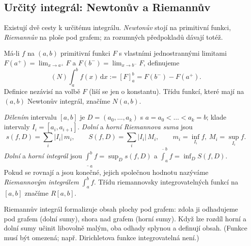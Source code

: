 \documentclass[11pt,a4paper]{article}
\begin{document}

\subsection{Určitý integrál: Newtonův a Riemannův}

Existují dvě cesty k určitému integrálu. \emph{Newtonův} stojí na primitivní funkci, \emph{Riemannův} na ploše pod grafem; za rozumných předpokladů dávají totéž.

\begin{definice}
Má-li $f$ na $(a,b)$ primitivní funkci $F$ s vlastními jednostrannými limitami $F(a^+)=\lim_{x\to a^+}F$ a $F(b^-)=\lim_{x\to b^-}F$, definujeme
\[
  (N)\!\int_a^b f(x)\,\mathrm{d}x:=[F]_a^b=F(b^-)-F(a^+).
\]
Definice nezávisí na volbě $F$ (liší se jen o konstantu). Třídu funkcí, které mají na $(a,b)$ Newtonův integrál, značíme $N(a,b)$.
\end{definice}

\begin{definice}
\emph{Dělením} intervalu $[a,b]$ je $D=(a_0,\dots,a_k)$ s $a=a_0<\dots<a_k=b$; klade intervaly $I_i=[a_i,a_{i+1}]$. \emph{Dolní} a \emph{horní Riemannova suma} jsou
\[
  s(f,D)=\sum_i |I_i|\,m_i,\qquad S(f,D)=\sum_i |I_i|\,M_i,\qquad m_i=\inf_{I_i}f,\ M_i=\sup_{I_i}f.
\]
\emph{Dolní} a \emph{horní integrál} jsou $\underline{\int}_a^b f=\sup_D s(f,D)$ a $\overline{\int}_a^b f=\inf_D S(f,D)$. Pokud se rovnají a jsou konečné, jejich společnou hodnotu nazýváme \emph{Riemannovým integrálem} $\int_a^b f$. Třídu riemannovsky integrovatelných funkcí na $[a,b]$ značíme $R[a,b]$.
\end{definice}

\begin{intuice}
Riemannův integrál formalizuje obsah plochy pod grafem: zdola ji odhadujeme  pod grafem (dolní sumy), shora  nad grafem (horní sumy). Když lze rozdíl horní a dolní sumy učinit libovolně malým, oba odhady splynou a definují obsah. (Funkce musí být omezená; např. Dirichletova funkce integrovatelná není.)
\end{intuice}
\end{document}
